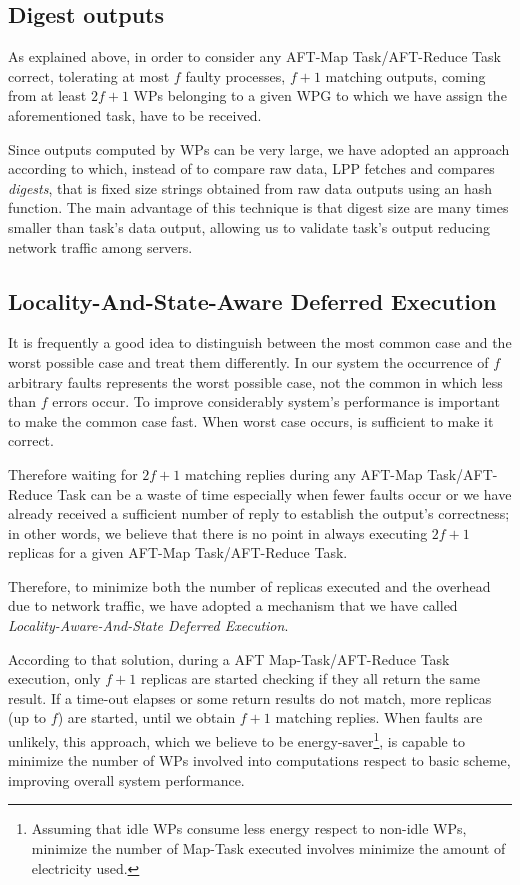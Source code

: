 \documentclass[sigchi]{acmart}
\begin{document}
\subsection{Digest outputs} As explained above, in order to consider any AFT-Map Task/AFT-Reduce Task correct, tolerating at most $f$ faulty processes, $f + 1$ matching outputs, coming from at least $2f + 1$ WPs belonging to a given WPG to which we have assign the aforementioned task, have to be received. 

Since outputs computed by WPs can be very large, we have adopted an approach according to which, instead of to compare raw data, LPP fetches and compares \textit{digests}, that is fixed size strings obtained from raw data outputs using an hash function. The main advantage of this technique is that digest size are many times smaller than task's data output, allowing us to validate task's output reducing network traffic among servers.

\subsection{Locality-And-State-Aware Deferred Execution} 

It is frequently a good idea to distinguish between the most common case and the worst possible case and treat them differently. In our system the occurrence of $f$ arbitrary faults represents the worst possible case, not the common in which less than $f$ errors occur. To improve considerably system's performance is important to make the common case fast. When worst case occurs, is sufficient to make it correct.

Therefore waiting for $2f + 1$ matching replies during any AFT-Map Task/AFT-Reduce Task can be a waste of time especially when fewer faults occur or we have already received a sufficient number of reply to establish the output's correctness; in other words, we believe that there is no point in always executing $2f + 1$ replicas for a given AFT-Map Task/AFT-Reduce Task.

Therefore, to minimize both the number of replicas executed and the overhead due to network traffic, we have adopted a mechanism that we have called \textit{Locality-Aware-And-State Deferred Execution}. 

According to that solution, during a AFT Map-Task/AFT-Reduce Task execution, only $f + 1$ replicas are started checking if they all return the same result. If a time-out elapses or some return results do not match, more replicas (up to $f$) are started, until we obtain $f + 1$ matching replies. When faults are unlikely, this approach, which we believe to be energy-saver\footnote{Assuming that idle WPs consume less energy respect to non-idle WPs, minimize the number of Map-Task executed involves minimize the amount of electricity used.}, is capable to minimize the number of WPs involved into computations respect to basic scheme, improving overall system performance.
\end{document}
